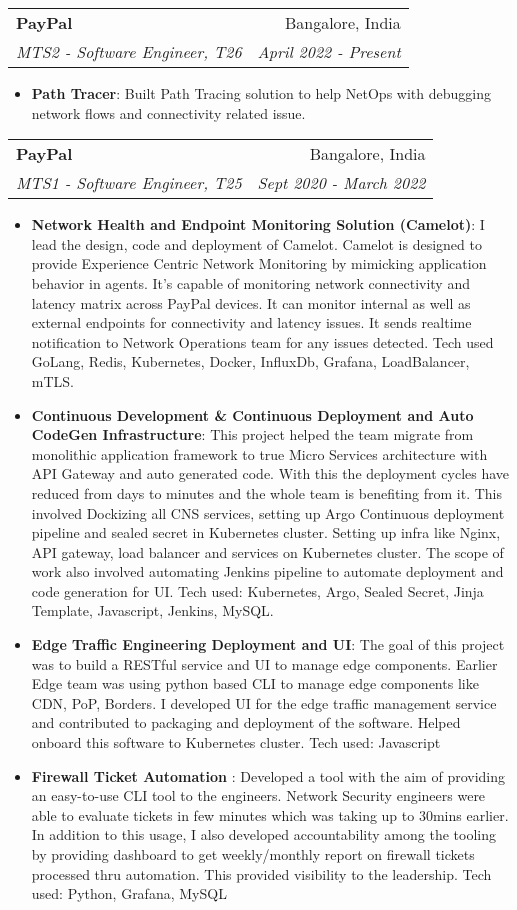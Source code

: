 \documentclass[letterpaper,11pt]{article}
\makeatletter
\newcommand{\resumeItem}[2]{
  \item\small{
    \textbf{#1}{: #2 \vspace{-2pt}}
  }
}
\newcommand{\resumeSubheading}[4]{
  \vspace{-1pt}\item
    \begin{tabular*}{0.97\textwidth}[t]{l@{\extracolsep{\fill}}r}
      \textbf{#1} & #2 \\
      \textit{\small#3} & \textit{\small #4} \\
    \end{tabular*}\vspace{-5pt}
}
\newcommand{\resumeItemListStart}{\begin{itemize}}
\newcommand{\resumeItemListEnd}{\end{itemize}\vspace{-5pt}}
\makeatother
\begin{document}
    \resumeSubheading
      {PayPal}{Bangalore, India}
      {MTS2 - Software Engineer, T26}{April 2022 - Present}
      \resumeItemListStart
        \resumeItem{Path Tracer}
          {Built Path Tracing solution to help NetOps with debugging network flows and connectivity related issue.}
    \resumeItemListEnd
    \resumeSubheading
      {PayPal}{Bangalore, India}
      {MTS1 - Software Engineer, T25}{Sept 2020 - March 2022}
      \resumeItemListStart
        \resumeItem{Network Health and Endpoint Monitoring Solution (Camelot)}
          {I lead the design, code and deployment of Camelot. Camelot is designed to provide Experience Centric Network Monitoring by mimicking application behavior in agents. It’s capable of monitoring network connectivity and latency matrix across PayPal devices. It can monitor internal as well as external endpoints for connectivity and latency issues. It sends realtime notification to Network Operations team for any issues detected. Tech used GoLang, Redis, Kubernetes, Docker, InfluxDb, Grafana, LoadBalancer, mTLS.}
        \resumeItem{Continuous Development \& Continuous Deployment and Auto CodeGen Infrastructure}
          {This project helped the team migrate from monolithic application framework to true Micro Services architecture with API Gateway and auto generated code. With this the deployment cycles have reduced from days to minutes and the whole team is benefiting from it. This involved Dockizing all CNS services, setting up Argo Continuous deployment pipeline and sealed secret in Kubernetes cluster. Setting up infra like Nginx, API gateway, load balancer and services on Kubernetes cluster. The scope of work also involved automating Jenkins pipeline to automate deployment and code generation for UI. Tech used: Kubernetes, Argo, Sealed Secret, Jinja Template, Javascript, Jenkins, MySQL. }
        \resumeItem{Edge Traffic Engineering Deployment and UI}
          {The goal of this project was to build a RESTful service and UI to manage edge components. Earlier Edge team was using python based CLI to manage edge components like CDN, PoP, Borders. I developed UI for the edge traffic management service and contributed to packaging and deployment of the software. Helped onboard this software to Kubernetes cluster. Tech used: Javascript}
        \resumeItem{Firewall Ticket Automation }
          {Developed a tool with the aim of providing an easy-to-use CLI tool to the engineers. Network Security engineers were able to evaluate tickets in few minutes which was taking up to 30mins earlier. In addition to this usage, I also developed accountability among the tooling by providing dashboard to get weekly/monthly report on firewall tickets processed thru automation. This provided visibility to the leadership. Tech used: Python, Grafana, MySQL}
      \resumeItemListEnd
      
\end{document}
